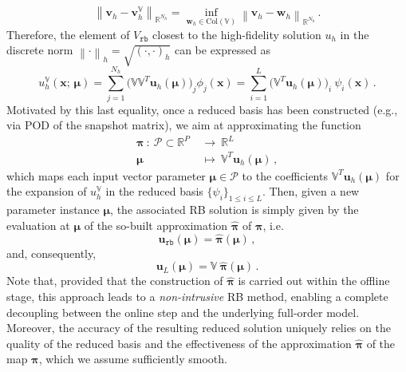 \documentclass[longtitle]{elsarticle}
\numberwithin{equation}{section}
\theoremstyle{theorem}
\theoremstyle{definition}
\theoremstyle{remark}
\theoremstyle{proposition}
\numberwithin{figure}{section}
\newcommand{\norm}[1]{\left\lVert#1\right\rVert}
\newcommand{\bg}[1]{\boldsymbol{#1}}
\begin{document}
		\begin{equation*}
			\norm{\mathbf{v}_h - \mathbf{v}_h^{\mathbb{V}}}_{\mathbb{R}^{N_h}} = \inf_{\mathbf{w}_h \in \text{Col}(\mathbb{V})} \norm{\mathbf{v}_h - \mathbf{w}_h}_{\mathbb{R}^{N_h}} \, .
		\end{equation*}
		Therefore, the element of $V_{\texttt{rb}}$ closest to the high-fidelity solution $u_h$ in the discrete norm $\norm{\cdot}_h = \sqrt{(\cdot,\cdot)_h}$ can be expressed as
		\begin{equation*}
			u^{\mathbb{V}}_h(\bg{x}; \, \bg{\mu}) = \sum_{j = 1}^{N_h} \big( \mathbb{V} \mathbb{V}^T \mathbf{u}_h(\bg{\mu}) \big)_j \phi_j(\bg{x}) = \sum_{i = 1}^L \big( \mathbb{V}^T \mathbf{u}_h(\bg{\mu}) \big)_i ~ \psi_i(\bg{x}) \, .
		\end{equation*}
		Motivated by this last equality, once a reduced basis has been constructed (e.g., via POD of the snapshot matrix), we aim at approximating the function
		\begin{equation}
			\label{eq:map-to-approximate}
			\begin{aligned}
				\bg{\pi} ~ : ~ \mathcal{P} \subset \mathbb{R}^P ~ & \rightarrow ~ \mathbb{R}^L \\
				\bg{\mu} ~~ & \mapsto ~ \mathbb{V}^T \mathbf{u}_h(\bg{\mu}) \, ,
			\end{aligned}
		\end{equation}
		which maps each input vector parameter $\bg{\mu} \in \mathcal{P}$ to the coefficients $\mathbb{V}^T \mathbf{u}_h(\bg{\mu})$ for the expansion of $u^{\mathbb{V}}_h$ in the reduced basis $\big\lbrace \psi_i \big\rbrace_{1 \leq i \leq L}$. Then, given a new parameter instance $\bg{\mu}$, the associated RB solution is simply given by the evaluation at $\bg{\mu}$ of the so-built approximation $\hat{\bg{\pi}}$ of $\bg{\pi}$, i.e.
		\begin{equation*}
			\mathbf{u}_{\texttt{rb}}(\bg{\mu}) = \hat{\bg{\pi}}(\bg{\mu}) \, ,
		\end{equation*}
		and, consequently,
		\begin{equation*}
			\mathbf{u}_L(\bg{\mu}) = \mathbb{V} ~ \hat{\bg{\pi}}(\bg{\mu}) \, .
		\end{equation*}
		Note that, provided that the construction of $\hat{\bg{\pi}}$ is carried out within the offline stage, this approach leads to a \emph{non-intrusive} RB method, enabling a complete decoupling between the online step and the underlying full-order model. Moreover, the accuracy of the resulting reduced solution uniquely relies on the quality of the reduced basis and the effectiveness of the approximation $\hat{\bg{\pi}}$ of the map $\bg{\pi}$, which we assume sufficiently smooth. 
\end{document}
